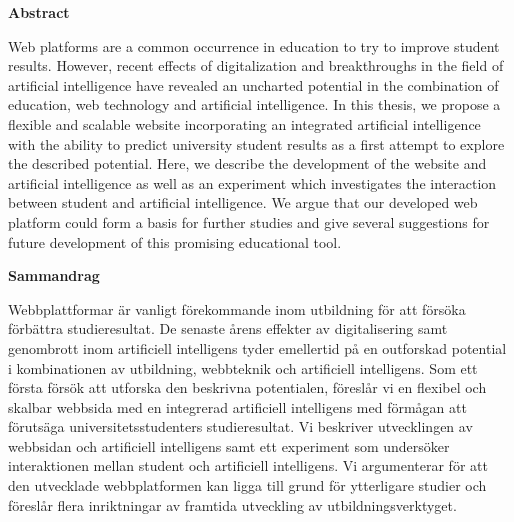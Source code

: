 \vspace*{2cm}
\begin{center}
    \Huge
    \textbf{Abstract}
\end{center}


\noindent Web platforms are a common occurrence in education to try to improve student results. However, recent effects of digitalization and breakthroughs in the field of artificial intelligence have revealed an uncharted potential in the combination of education, web technology and artificial intelligence. In this thesis, we propose a flexible and scalable website incorporating an integrated artificial intelligence with the ability to predict university student results as a first attempt to explore the described potential. Here, we describe the development of the website and artificial intelligence as well as an experiment which investigates the interaction between student and artificial intelligence. We argue that our developed web platform could form a basis for further studies and give several suggestions for future development of this promising educational tool. 

\vspace{2.5cm}

\begin{center}
    \Huge
    \textbf{Sammandrag}
\end{center}
\noindent Webbplattformar är vanligt förekommande inom utbildning för att försöka förbättra studieresultat. De senaste årens effekter av digitalisering samt genombrott inom artificiell intelligens tyder emellertid på en outforskad potential i kombinationen av utbildning, webbteknik och artificiell intelligens. Som ett första försök att utforska den beskrivna potentialen, föreslår vi en flexibel och skalbar webbsida med en integrerad artificiell intelligens med förmågan att förutsäga universitetsstudenters  studieresultat. Vi beskriver utvecklingen av webbsidan och artificiell intelligens samt ett experiment som undersöker interaktionen mellan student och artificiell intelligens. Vi argumenterar för att den utvecklade webbplatformen kan ligga till grund för ytterligare studier och föreslår flera inriktningar av framtida utveckling av utbildningsverktyget.

